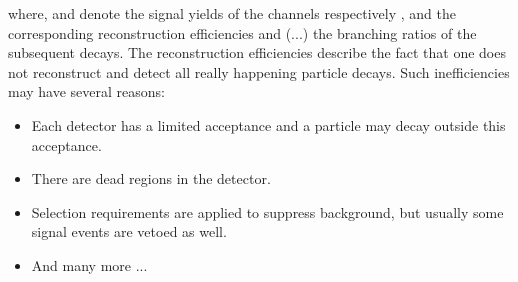 where, \NDp and \NLc denote the signal yields of the channels \LbToDpmunuX respectively \LbToLcmunu, \effDp and \effLc the corresponding reconstruction efficiencies and \BR(...) the branching ratios of the subsequent decays.
The reconstruction efficiencies describe the fact that one does not reconstruct and detect all really happening particle decays.
Such inefficiencies may have several reasons:
\begin{itemize}
    \item Each detector has a limited acceptance and a particle may decay outside this acceptance.
    \item There are dead regions in the detector.
    \item Selection requirements are applied to suppress background, but usually some signal events are vetoed as well.
    \item And many more ...
\end{itemize}

